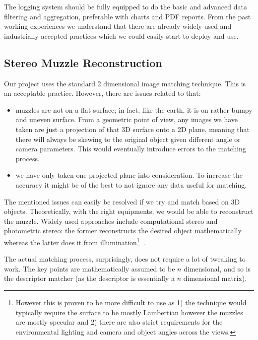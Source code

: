 The logging system should be fully equipped to do the basic and advanced data filtering and aggregation, preferable with charts and PDF reports. From the past working experiences we understand that there are already widely used and industrially accepted practices which we could easily start to deploy and use. 

\subsection{Stereo Muzzle Reconstruction}

Our project uses the standard 2 dimensional image matching technique. This is an acceptable practice. However, there are issues related to that:

\begin{itemize}
	\item muzzles are not on a flat surface; in fact, like the earth, it is on rather bumpy and uneven surface. From a geometric point of view, any images we have taken are just a projection of that 3D surface onto a 2D plane, meaning that there will always be skewing to the original object given different angle or camera parameters. This would eventually introduce errors to the matching process.
	\item we have only taken one projected plane into consideration. To increase the accuracy it might be of the best to not ignore any data useful for matching.
\end{itemize}

The mentioned issues can easily be resolved if we try and match based on 3D objects. Theoretically, with the right equipments, we would be able to reconstruct the muzzle. Widely used approaches include computational stereo and photometric stereo: the former reconstructs the desired object mathematically~\cite{computational_stereo} whereas the latter does it from illumination\footnote{However this is proven to be more difficult to use as 1) the technique would typically require the surface to be mostly Lambertian however the muzzles are mostly specular and 2) there are also strict requirements for the environmental lighting and camera and object angles across the views.}~\cite{photometric_stereo}.

The actual matching process, surprisingly, does not require a lot of tweaking to work. The key points are mathematically assumed to be $n$ dimensional, and so is the descriptor matcher (as the descriptor is essentially a $n$ dimensional matrix).
